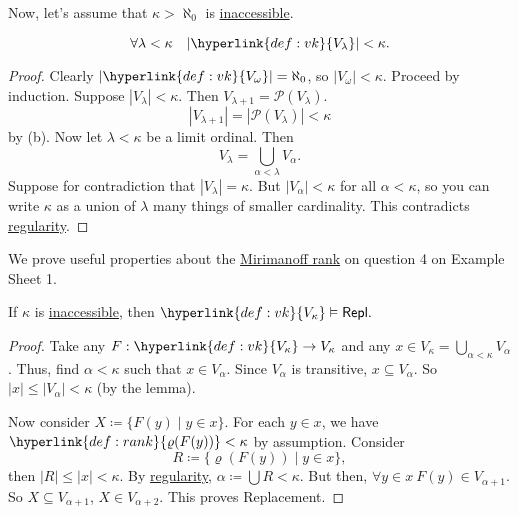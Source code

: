 \documentclass{article}
\newcommand{\1}{\mathbbm{1}}
\let\models\vDash
\begin{document}
Now, let's assume that $\kappa > \aleph_0$ is \hyperlink{def:inacc}{inaccessible}.
\begin{lemma}
  \begin{equation*}
    \forall \lambda < \kappa \quad |\hyperlink{def:vk}{V_\lambda}| < \kappa.
  \end{equation*}
\end{lemma}
\begin{proof}
  Clearly $|\hyperlink{def:vk}{V_\omega}| = \aleph_0$, so $|V_\omega| < \kappa$.
  Proceed by induction. Suppose $|V_\lambda| < \kappa$. Then $V_{\lambda+1} = \mathcal{P}(V_\lambda)$.
  \begin{equation*}
  |V_{\lambda+1}| = |\mathcal{P}(V_\lambda)| < \kappa
  \end{equation*}
  by (b).
  Now let $\lambda < \kappa$ be a limit ordinal.
  Then
  \begin{equation*}
    V_\lambda = \bigcup_{\alpha < \lambda} V_\alpha.
  \end{equation*}
  Suppose for contradiction that $|V_\lambda| = \kappa$. But $|V_\alpha| < \kappa$ for all $\alpha < \kappa$, so you can write $\kappa$ as a union of $\lambda$ many things of smaller cardinality.
  This contradicts \hyperlink{def:reg}{regularity}.
\end{proof}

We prove useful properties about the \hyperlink{def:rank}{Mirimanoff rank} on question 4 on Example Sheet 1.

\begin{thm}
  If $\kappa$ is \hyperlink{def:inacc}{inaccessible}, then $\hyperlink{def:vk}{V_\kappa} \models \textsf{Repl}.$
\end{thm}
\begin{proof}
  Take any $F: \hyperlink{def:vk}{V_\kappa} \to V_\kappa$ and any $x \in V_\kappa = \bigcup_{\alpha < \kappa} V_\alpha$.
  Thus, find $\alpha < \kappa$ such that $x \in V_\alpha$.
  Since $V_\alpha$ is transitive, $x \subseteq V_\alpha$.
  So $|x| \leq |V_\alpha| < \kappa$ (by the lemma).

  Now consider $X \coloneqq \{F(y) \mid y \in x\}$.
  For each $y \in x$, we have $\hyperlink{def:rank}{\varrho(F(y))} < \kappa$ by assumption.
  Consider
  \begin{equation*}
  R \coloneqq \{\varrho(F(y)) \mid y \in x\},
  \end{equation*}
  then $|R| \leq |x| < \kappa$.
  By \hyperlink{def:reg}{regularity}, $\alpha \coloneqq \bigcup R < \kappa$.
  But then, $\forall y \in x \ F(y) \in V_{\alpha+1}$.
  So $X \subseteq V_{\alpha+1}$, $X \in V_{\alpha+2}$. This proves Replacement.
\end{proof}
\end{document}
